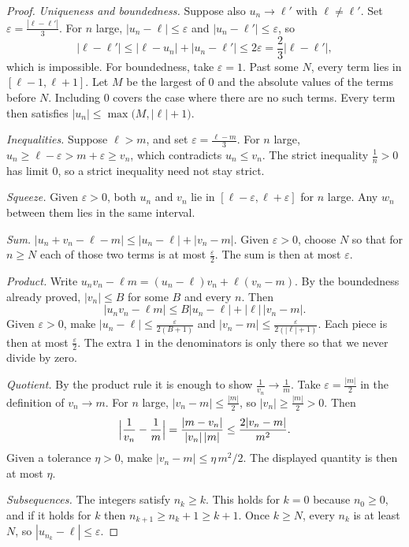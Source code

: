\begin{proof}
\emph{Uniqueness and boundedness.} Suppose also $u_n\to\ell'$ with $\ell\ne\ell'$. Set $\varepsilon=\frac{|\ell-\ell'|}3$. For $n$ large, $|u_n-\ell|\le\varepsilon$ and $|u_n-\ell'|\le\varepsilon$, so
\[
|\ell-\ell'|\le|\ell-u_n|+|u_n-\ell'|\le2\varepsilon=\frac{2}{3}|\ell-\ell'|,
\]
which is impossible. For boundedness, take $\varepsilon=1$. Past some $N$, every term lies in $[\ell-1,\ell+1]$. Let $M$ be the largest of $0$ and the absolute values of the terms before $N$. Including $0$ covers the case where there are no such terms. Every term then satisfies $|u_n|\le\max\bigl(M,|\ell|+1\bigr)$.

\emph{Inequalities.} Suppose $\ell>m$, and set $\varepsilon=\frac{\ell-m}3$. For $n$ large, $u_n\ge\ell-\varepsilon>m+\varepsilon\ge v_n$, which contradicts $u_n\le v_n$. The strict inequality $\frac1n>0$ has limit $0$, so a strict inequality need not stay strict.

\emph{Squeeze.} Given $\varepsilon>0$, both $u_n$ and $v_n$ lie in $[\ell-\varepsilon,\ell+\varepsilon]$ for $n$ large. Any $w_n$ between them lies in the same interval.

\emph{Sum.} $|u_n+v_n-\ell-m|\le|u_n-\ell|+|v_n-m|$. Given $\varepsilon>0$, choose $N$ so that for $n\ge N$ each of those two terms is at most $\frac\varepsilon2$. The sum is then at most $\varepsilon$.

\emph{Product.} Write $u_nv_n-\ell m=(u_n-\ell)v_n+\ell(v_n-m)$. By the boundedness already proved, $|v_n|\le B$ for some $B$ and every $n$. Then
\[
|u_nv_n-\ell m|\le B|u_n-\ell|+|\ell|\,|v_n-m|.
\]
Given $\varepsilon>0$, make $|u_n-\ell|\le\frac{\varepsilon}{2(B+1)}$ and $|v_n-m|\le\frac{\varepsilon}{2(|\ell|+1)}$. Each piece is then at most $\frac\varepsilon2$. The extra $1$ in the denominators is only there so that we never divide by zero.

\emph{Quotient.} By the product rule it is enough to show $\frac1{v_n}\to\frac1m$. Take $\varepsilon=\frac{|m|}2$ in the definition of $v_n\to m$. For $n$ large, $|v_n-m|\le\frac{|m|}2$, so $|v_n|\ge\frac{|m|}2>0$. Then
\[
\Bigl|\frac1{v_n}-\frac1m\Bigr|=\frac{|m-v_n|}{|v_n|\,|m|}\le\frac{2|v_n-m|}{m^2}.
\]
Given a tolerance $\eta>0$, make $|v_n-m|\le\eta\, m^2/2$. The displayed quantity is then at most $\eta$.

\emph{Subsequences.} The integers satisfy $n_k\ge k$. This holds for $k=0$ because $n_0\ge0$, and if it holds for $k$ then $n_{k+1}\ge n_k+1\ge k+1$. Once $k\ge N$, every $n_k$ is at least $N$, so $|u_{n_k}-\ell|\le\varepsilon$.
\end{proof}

